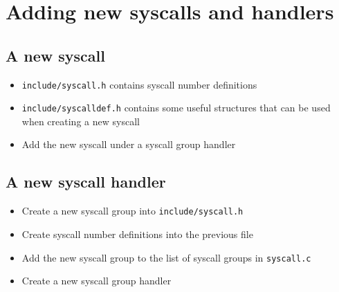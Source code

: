 \chapter{Adding new syscalls and handlers}

\section{A new syscall}

\begin{itemize}
\item \verb+include/syscall.h+ contains syscall number definitions
\item \verb+include/syscalldef.h+ contains some useful structures that can be used when
      creating a new syscall
\item Add the new syscall under a syscall group handler
\end{itemize}

\section{A new syscall handler}

\begin{itemize}
\item Create a new syscall group into \verb+include/syscall.h+
\item Create syscall number definitions into the previous file
\item Add the new syscall group to the list of syscall groups in \verb+syscall.c+
\item Create a new syscall group handler
\end{itemize}



